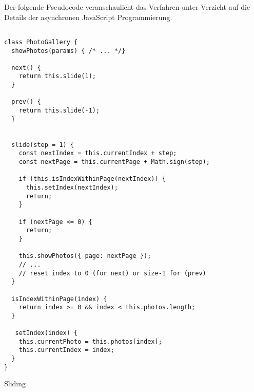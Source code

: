 Der folgende Pseudocode veranschaulicht das Verfahren unter Verzicht auf die Details der asynchronen JavaScript Programmierung.

\begin{listing}[H]
\begin{verbatim}

class PhotoGallery {
  showPhotos(params) { /* ... */}

  next() {
    return this.slide(1);
  }

  prev() {
    return this.slide(-1);
  }


  slide(step = 1) {
    const nextIndex = this.currentIndex + step;
    const nextPage = this.currentPage + Math.sign(step);

    if (this.isIndexWithinPage(nextIndex)) {
      this.setIndex(nextIndex);
      return;
    }

    if (nextPage <= 0) {
      return;
    }

    this.showPhotos({ page: nextPage });
    // ... 
    // reset index to 0 (for next) or size-1 for (prev)  
  }

  isIndexWithinPage(index) {
    return index >= 0 && index < this.photos.length;
  }

   setIndex(index) {
    this.currentPhoto = this.photos[index];
    this.currentIndex = index;
  }
}

\end{verbatim}
\caption{Sliding}
\label{lst:sliding}
\end{listing} 
